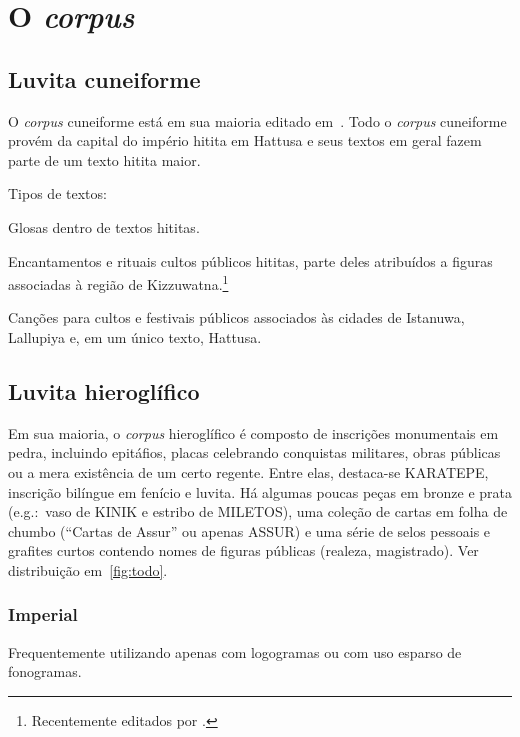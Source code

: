 \documentclass[article]{luvita}
\begin{document}
\chapter{O \emph{corpus}}

\section{Luvita cuneiforme}

O \emph{corpus} cuneiforme está em sua maioria editado em~\citet{Starke1985}.
Todo o \emph{corpus} cuneiforme provém da capital do império hitita em Hattusa e
seus textos em geral fazem parte de um texto hitita maior.

\noindent Tipos de textos:
\begin{compactitem}
	\item Glosas dentro de textos hititas.
	\item Encantamentos e rituais cultos públicos hititas, parte deles atribuídos
	a figuras associadas à região de
	Kizzuwatna.\footnote{Recentemente editados por \citet{YakubovichMouton2023}.}
	\item Canções para cultos e festivais públicos associados às cidades de
	Istanuwa, Lallupiya e, em um único texto, Hattusa.
\end{compactitem}

\section{Luvita hieroglífico}

Em sua maioria, o \emph{corpus} hieroglífico é composto de inscrições
monumentais em pedra, incluindo epitáfios, placas celebrando conquistas
militares, obras públicas ou a mera existência de um certo regente.
Entre elas, destaca-se KARATEPE, inscrição bilíngue em fenício e luvita.
Há algumas poucas peças em bronze e prata (e.g.:\ vaso de KINIK e estribo de
MILETOS), uma coleção de cartas em folha de chumbo (``Cartas de Assur'' ou
apenas ASSUR) e uma série de selos pessoais e grafites curtos contendo nomes de
figuras públicas (realeza, magistrado). Ver distribuição em~\autoref{fig:todo}.

\subsection{Imperial}

Frequentemente utilizando apenas com logogramas ou com uso esparso de fonogramas.
\end{document}
